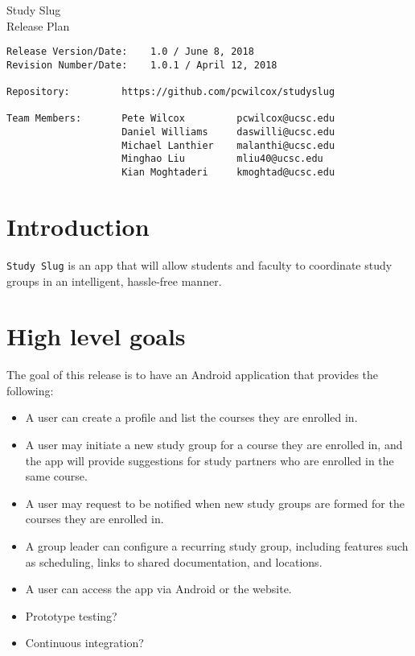 \documentclass[10pt]{article}
\begin{document}
    
    \begin{center}
        \Huge{Study Slug} \\
        \Large{Release Plan}
    \end{center}
    \begin{verbatim}
Release Version/Date:    1.0 / June 8, 2018        
Revision Number/Date:    1.0.1 / April 12, 2018

Repository:         https://github.com/pcwilcox/studyslug

Team Members:       Pete Wilcox         pcwilcox@ucsc.edu    
                    Daniel Williams     daswilli@ucsc.edu  
                    Michael Lanthier    malanthi@ucsc.edu  
                    Minghao Liu         mliu40@ucsc.edu
                    Kian Moghtaderi     kmoghtad@ucsc.edu
    \end{verbatim}
    
    \section{Introduction}
    \texttt{Study Slug} is an app that will allow students and faculty to coordinate study groups in an intelligent, hassle-free manner.
    
    \section{High level goals}
    The goal of this release is to have an Android application that provides the following:
    \begin{itemize}
        \item A user can create a profile and list the courses they are enrolled in.
        \item A user may initiate a new study group for a course they are enrolled in, and the app will provide suggestions for study partners who are enrolled in the same course.
        \item A user may request to be notified when new study groups are formed for the courses they are enrolled in.
        \item A group leader can configure a recurring study group, including features such as scheduling, links to shared documentation, and locations.
        \item A user can access the app via Android or the website.
        \item Prototype testing?
        \item Continuous integration?
    \end{itemize}
    
\end{document}
